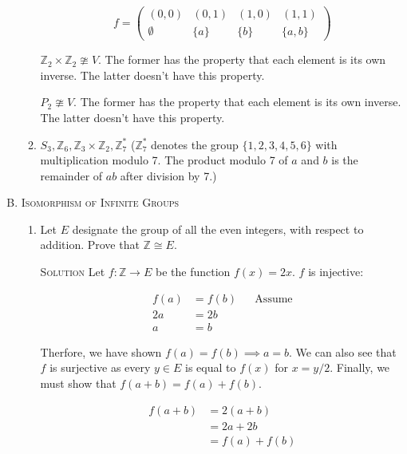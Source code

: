 \documentclass[twoside]{amsart}
\newcommand{\solution}{\textsc{Solution}\xspace}
\newcommand{\iso}{\cong}
\newcommand{\niso}{\ncong}
\newcommand{\blank}{\vspace{5pt}}
\begin{document}
\begin{enumerate}[A.]
\begin{enumerate}[1]
      \[
         f =
            \begin{pmatrix}
               (0,0)     & (0,1) & (1,0) & (1,1) \\
               \emptyset & \{a\} & \{b\} & \{a,b\}
            \end{pmatrix}
      \]

      $\mathbb{Z}_2 \times \mathbb{Z}_2 \niso V$. The former
      has the property that each element is its own inverse. The
      latter doesn't have this property.

      $P_2 \niso V$. The former has the property that each element
      is its own inverse. The latter doesn't have this property.

      \blank
      \item $S_3, \mathbb{Z}_6, \mathbb{Z}_3 \times \mathbb{Z}_2,
      \mathbb{Z}_7^*$ ($\mathbb{Z}_7^*$ denotes the group
      $\{1,2,3,4,5,6\}$ with multiplication modulo 7. The product
      modulo 7 of $a$ and $b$ is the remainder of $ab$ after
      division by 7.)
   \end{enumerate}

   \item \textsc{Isomorphism of Infinite Groups}
   \begin{enumerate}[1]
      \item Let $E$ designate the group of all the even integers, with
      respect to addition. Prove that $\mathbb{Z} \iso E$.

      \blank \noindent \solution Let $f : \mathbb{Z} \to E$ be the function
      $f(x) = 2x$. $f$ is injective:

      \setcounter{equation}{0}
      \begin{align}
         f(a) &= f(b)      && \text{Assume} \\
         2a   &= 2b \\
          a   &= b    
      \end{align}

      Therfore, we have shown $f(a)=f(b) \implies a=b$. We can also
      see that $f$ is surjective as every $y \in E$ is equal to $f(x)$
      for $x = y/2$. Finally, we must show that $f(a+b)=f(a)+f(b)$.

      \setcounter{equation}{0}
      \begin{align}
         f(a+b) &= 2(a+b) \\
                &= 2a + 2b \\
                &= f(a) + f(b)
      \end{align}


\end{enumerate}
\end{enumerate}
\end{document}
